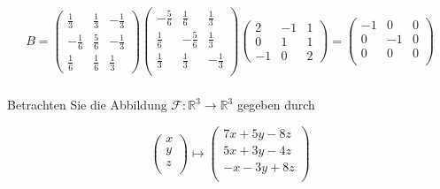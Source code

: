 \begin{solution}
    \begin{equation*}
        B = \begin{pmatrix}
            \frac{1}{3} & \frac{1}{3} & -\frac{1}{3} \\
            -\frac{1}{6} & \frac{5}{6} & -\frac{1}{3} \\
            \frac{1}{6} & \frac{1}{6} & \frac{1}{3}
        \end{pmatrix} \begin{pmatrix}
            -\frac{5}{6} & \frac{1}{6} & \frac{1}{3} \\
            \frac{1}{6}  & -\frac{5}{6} & \frac{1}{3} \\
            \frac{1}{3} & \frac{1}{3} & -\frac{1}{3} \\
        \end{pmatrix} \begin{pmatrix}
            2 & -1 & 1 \\
            0 & 1 & 1 \\
            -1 & 0 & 2
        \end{pmatrix} = \begin{pmatrix}
            -1 & 0 & 0 \\
            0 & -1 & 0 \\
            0 & 0 & 0 \\
        \end{pmatrix}
    \end{equation*}

\end{solution}

\newpage

\subsubsection{} %

Betrachten Sie die Abbildung \( \mathcal{F}: \mathbb{R}^3 \rightarrow \mathbb{R}^3 \) gegeben durch

\begin{equation*}
    \begin{pmatrix}
    x\\
    y\\
    z\\
    \end{pmatrix} \mapsto
    \begin{pmatrix}
    7x+5y-8z\\
    5x+3y-4z\\
    -x-3y+8z\\
    \end{pmatrix}
\end{equation*}

